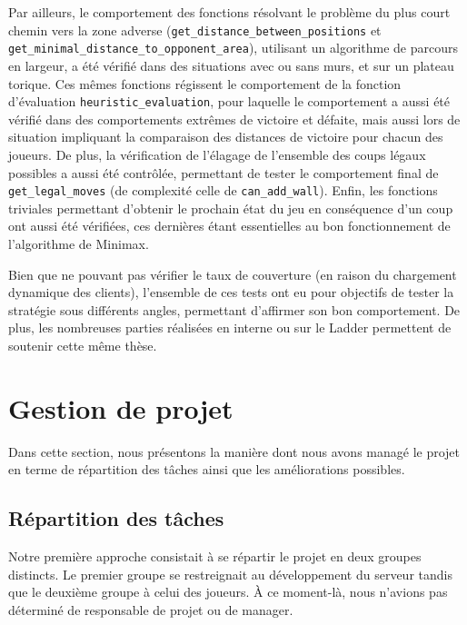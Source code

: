 \documentclass[11pt]{article}
\begin{document}
Par ailleurs, le comportement des fonctions résolvant le problème du plus court chemin vers la zone adverse (\texttt{get\_distance\_between\_positions} et \texttt{get\_minimal\_distance\_to\_opponent\_area}), utilisant un algorithme de parcours en largeur, a été vérifié dans des situations avec ou sans murs, et sur un plateau torique. Ces mêmes fonctions régissent le comportement de la fonction d'évaluation \texttt{heuristic\_evaluation}, pour laquelle le comportement a aussi été vérifié dans des comportements extrêmes de victoire et défaite, mais aussi lors de situation impliquant la comparaison des distances de victoire pour chacun des joueurs. De plus, la vérification de l'élagage de l'ensemble des coups légaux possibles a aussi été contrôlée, permettant de tester le comportement final de \texttt{get\_legal\_moves} (de complexité celle de \texttt{can\_add\_wall}). Enfin, les fonctions triviales permettant d'obtenir le prochain état du jeu en conséquence d'un coup ont aussi été vérifiées, ces dernières étant essentielles au bon fonctionnement de l'algorithme de Minimax.

Bien que ne pouvant pas vérifier le taux de couverture (en raison du chargement dynamique des clients), l'ensemble de ces tests ont eu pour objectifs de tester la stratégie sous différents angles, permettant d'affirmer son bon comportement. De plus, les nombreuses parties réalisées en interne ou sur le Ladder permettent de soutenir cette même thèse.



\newpage
\section{Gestion de projet}
Dans cette section, nous présentons la manière dont nous avons managé le projet en terme de répartition des tâches ainsi que les améliorations possibles.

\subsection{Répartition des tâches}
Notre première approche consistait à se répartir le projet en deux groupes distincts. Le premier groupe se restreignait au développement du serveur tandis que le deuxième groupe à celui des joueurs. À ce moment-là, nous n'avions pas déterminé de responsable de projet ou de manager.
\end{document}

